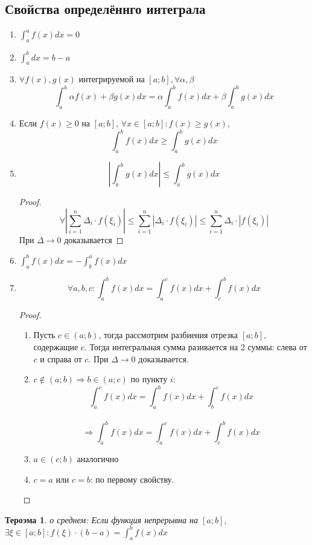 \documentclass[oneside]{book}
\newtheorem{thm}{Тероэма}[chapter] %
\begin{document}
\begin{itemize}
\begin{enumerate}
\section[Свойства]{Свойства определённго интеграла}
\begin{enumerate}
  \item $\int_{a}^a f(x) dx = 0$
  \item $\int_{a}^b dx = b-a$
  \item $\forall f(x), g(x)$ интегрируемой на $[a;b], \forall \alpha, \beta$ $$
          \int_{a}^b \alpha f(x) + \beta g(x) dx = \alpha \int_{a}^b f(x) dx + \beta \int_{a}^b g(x) dx
        $$
  \item Если $f(x) \geq 0$ на $[a;b]$, $\forall x \in [a;b]: f(x) \geq g(x)$, $$\int_{a}^b f(x) dx \geq \int_{a}^b g(x) dx$$
  \item $$|\int_{a}^b g(x) dx| \leq \int_{a}^b g(x) dx$$
  \begin{proof}
      $$ \forall |\sum_{i = 1}^n \Delta_i \cdot f(\xi_i)| \leq \sum_{i = 1}^n |\Delta_i \cdot f(\xi_i)| \leq \sum_{i = 1}^n \Delta_i \cdot |f(\xi_i)|$$
      При $\Delta \rightarrow 0$ доказывается
    \end{proof}
  \item $\int_{a}^b f(x) dx = -\int_{b}^a f(x) dx$
  \item $$
    \forall a, b, c: \int_{a}^b f(x) dx = \int_{a}^c f(x) dx + \int_{c}^b f(x) dx
  $$
  \begin{proof}
    \begin{enumerate}
      \item Пусть $c \in (a;b)$, тогда рассмотрим разбиения отрезка $[a;b]$, содержащие $c$. Тогда интегральная сумма разивается на 2 суммы: слева от $c$
      и справа от $c$. При $\Delta \rightarrow 0$ доказывается.
      \item $c \not\in (a;b) \Rightarrow b \in (a;c)$ по пункту $i$:$$
        \int_{a}^c f(x) dx = \int_{a}^b f(x) dx + \int_{b}^c f(x) dx $$\\$$ \Rightarrow \int_{a}^b f(x) dx = \int_{a}^c f(x) dx + \int_{c}^b f(x) dx
      $$
      \item $a \in (c;b)$ аналогично
      \item $c = a$ или $c = b$: по первому свойству.
    \end{enumerate}
  \end{proof}
\end{enumerate}
\begin{thm}
  о среднем: Если функция непрерывна на $[a;b]$, $\exists \xi \in [a;b]: f(\xi) \cdot (b - a) = \int_{a}^b f(x) dx$

\end{thm}
\end{enumerate}
\end{itemize}
\end{document}
